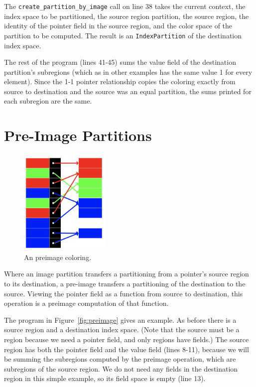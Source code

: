 The {\tt create\_partition\_by\_image} call on line 38 takes the current context, the index space to be partitioned, the source region partition, the source region, the identity of the pointer field in the source region, and the color space of the partition to be computed.  The result is an {\tt IndexPartition} of the destination index space.

The rest of the program (lines 41-45) sums the value field of the destination partition's subregions (which as in other examples has the same value 1 for every element).  Since the 1-1 pointer relationship copies the coloring exactly from source to destination and the source was an equal partition, the sums printed for each subregion are the same.

\begin{figure}
  {\small
    
  }
  \caption{}
  \label{fig:image}
\end{figure}

\section{Pre-Image Partitions}
\label{sec:preimage}


\begin{figure}
  \centering
  \includegraphics[height=2in]{figs/preimage.png}
  \caption{An preimage coloring.}
  \label{fig:expreimage}
\end{figure}

Where an image partition transfers a partitioning from a pointer's source region to its destination, a pre-image transfers a partitioning of the destination to the source.  Viewing
the pointer field as a function from source to destination, this operation is a preimage computation of that function.

The program in Figure~\ref{fig:preimage} gives an example.  As before there is a source region and a destination index space.  (Note that the source must be a region because
we need a pointer field, and only regions have fields.)  The source region has both the pointer field and the value field (lines 8-11), because we will be summing the subregions computed
by the preimage operation, which are subregions of the source region.  We do not need any fields in the destination region in this simple example, so its field space is empty (line 13).

